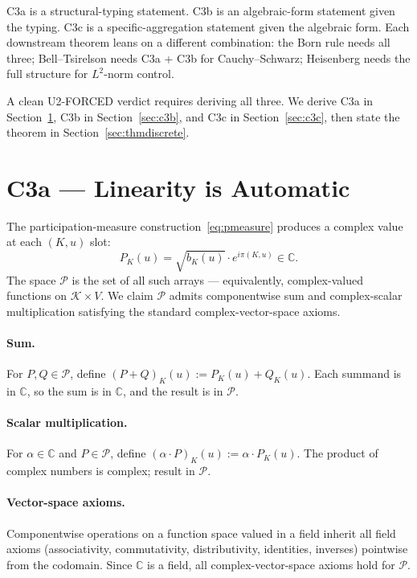 \documentclass[11pt,a4paper]{article}
\begin{document}
C3a is a structural-typing statement. C3b is an algebraic-form statement given the typing. C3c is a specific-aggregation statement given the algebraic form. Each downstream theorem leans on a different combination: the Born rule needs all three; Bell--Tsirelson needs C3a + C3b for Cauchy--Schwarz; Heisenberg needs the full structure for $L^2$-norm control.

A clean U2-FORCED verdict requires deriving all three. We derive C3a in Section~\ref{sec:c3a}, C3b in Section~\ref{sec:c3b}, and C3c in Section~\ref{sec:c3c}, then state the theorem in Section~\ref{sec:thmdiscrete}.

\section{C3a --- Linearity is Automatic}\label{sec:c3a}

The participation-measure construction~\eqref{eq:pmeasure} produces a complex value at each $(K, u)$ slot:
\begin{equation}
P_K(u) = \sqrt{b_K(u)} \cdot e^{i \pi(K, u)} \in \mathbb{C}.
\label{eq:slot}
\end{equation}
The space $\mathcal{P}$ is the set of all such arrays --- equivalently, complex-valued functions on $\mathcal{K} \times V$. We claim $\mathcal{P}$ admits componentwise sum and complex-scalar multiplication satisfying the standard complex-vector-space axioms.

\paragraph{Sum.} For $P, Q \in \mathcal{P}$, define $(P + Q)_K(u) := P_K(u) + Q_K(u)$. Each summand is in $\mathbb{C}$, so the sum is in $\mathbb{C}$, and the result is in $\mathcal{P}$.

\paragraph{Scalar multiplication.} For $\alpha \in \mathbb{C}$ and $P \in \mathcal{P}$, define $(\alpha \cdot P)_K(u) := \alpha \cdot P_K(u)$. The product of complex numbers is complex; result in $\mathcal{P}$.

\paragraph{Vector-space axioms.} Componentwise operations on a function space valued in a field inherit all field axioms (associativity, commutativity, distributivity, identities, inverses) pointwise from the codomain. Since $\mathbb{C}$ is a field, all complex-vector-space axioms hold for $\mathcal{P}$.
\end{document}
